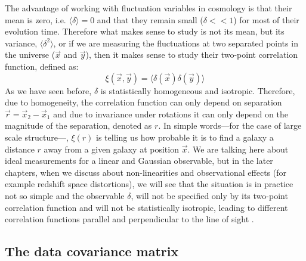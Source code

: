 The advantage of working with fluctuation variables in cosmology is that their mean is zero, i.e. $\langle \delta \rangle = 0$
and that they remain small ($\delta<<1$) for most of their evolution time.
Therefore what makes sense to study is not its mean, but its variance, $\langle \delta^2 \rangle$, or if 
we are measuring the fluctuations at two separated points in the universe ($\vec{x}$ and $\vec{y}$),
then it makes sense to study their two-point correlation function, defined as:
\begin{equation} \label{eq:correlationfunct}
\xi(\vec{x} ,\vec{y}) = \langle \delta (\vec{x})  \delta (\vec{y}) \rangle
\end{equation}
As we have seen before, $\delta$ is statistically homogeneous and isotropic. Therefore, due to homogeneity, the correlation
function can only depend on separation $\vec r = \vec{x}_2 - \vec{x}_1 $ and due to invariance under 
rotations it can only depend on the magnitude of the separation, denoted as $r$.
In simple words---for the case of large scale structure---, $\xi(r)$ is telling us how probable it is to find
a galaxy a distance $r$ away from a given galaxy at position $\vec x$.
We are talking here about ideal measurements for a linear and Gaussian observable, but in the later chapters, when we discuss
about non-linearities and observational effects (for example redshift space distortions), we will see that the situation is in practice not so simple and 
the observable $\delta$, will not be specified only by its 
two-point correlation function and will not be statistically isotropic, leading to different correlation
functions parallel and perpendicular to the line of sight \cite{(cite some BAO stuff)}.

\subsection{The data covariance matrix}

